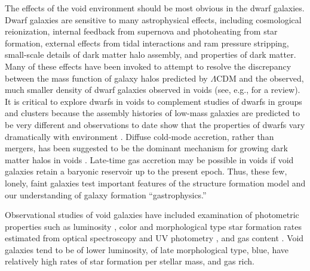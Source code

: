  
The effects of the void environment should be most obvious in the dwarf 
galaxies.  Dwarf galaxies are sensitive to many astrophysical effects, including 
cosmological reionization, internal feedback from supernova and photoheating 
from star formation, external effects from tidal interactions and ram pressure 
stripping, small-scale details of dark matter halo assembly, and properties of 
dark matter. Many of these effects have been invoked to attempt to resolve the 
discrepancy between the mass function of galaxy halos predicted by $\Lambda$CDM 
and the observed, much smaller density of dwarf galaxies observed in voids (see, 
e.g., \cite{Kravtsov09} for a review).  It is critical to explore dwarfs in 
voids to complement studies of dwarfs in groups and clusters because the 
assembly histories of low-mass galaxies are predicted to be very different 
\citep[e.g.,][]{Gao07, Lackner12} and observations to date show that the 
properties of dwarfs vary dramatically with environment \citep[e.g.,][]{Ann08, 
Geha12}.  Diffuse cold-mode accretion, rather than mergers, has been suggested 
to be the dominant mechanism for growing dark matter halos in voids 
\citep[e.g.,][]{Keres05, Fakhouri09}.  Late-time gas accretion may be possible 
in voids if void galaxies retain a baryonic reservoir up to the present epoch.  
Thus, these few, lonely, faint galaxies test important features of the structure 
formation model and our understanding of galaxy formation ``gastrophysics.''


Observational studies of void galaxies have included examination of photometric 
properties such as luminosity \citep{Hoyle05, Croton05, Moorman15}, color and 
morphological type \citep{Grogin00, Rojas04, Patiri06, Park07, 
vonBendaBeckmann08, Hoyle12} star formation rates estimated from optical 
spectroscopy and UV photometry \citep{Rojas05, Moorman15, Beygu16}, and gas 
content \citep{Kreckel12, Moorman16, Jones16}.  Void galaxies tend to be of 
lower luminosity, of late morphological type, blue, have relatively high rates 
of star formation per stellar mass, and gas rich.


